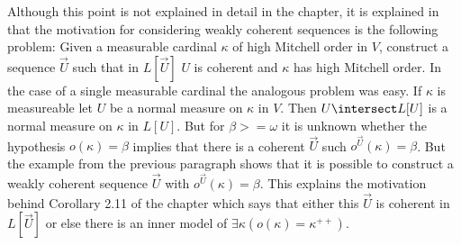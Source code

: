 \documentclass[oneside,12pt]{amsart}
\begin{document}
Although this point is not explained in detail in the chapter,
it is explained in \cite{Mitchell-Revisited}
that the motivation for considering weakly coherent sequences is the following problem:
Given a measurable cardinal $\kappa$ of high Mitchell order in $V$, construct a sequence $\vec{U}$ such that
in $L[\vec{U}]$ $U$ is coherent and $\kappa$ has high Mitchell order. In the case of
a single measurable cardinal the analogous problem was easy. If $\kappa$ is measureable let $U$ be a normal
measure on $\kappa$ in $V$. Then $U\intersect L[U]$ is a normal measure on $\kappa$ in
$L[U]$. But for $\beta>=\omega$ it is unknown whether the hypothesis $o(\kappa) = \beta$
implies that there is a coherent $\vec{U}$ such $o^{\vec{U}}(\kappa) = \beta$.
But the example from the previous paragraph shows that it is possible to construct a weakly coherent
sequence $\vec{U}$ with $o^{\vec{U}}(\kappa) = \beta$.
This explains the motivation behind Corollary 2.11 of the chapter which says that either
this $\vec{U}$ is coherent in $L[\vec{U}]$ or else there is an inner model
of $\exists \kappa (o(\kappa) = \kappa^{++})$.





\end{document}
